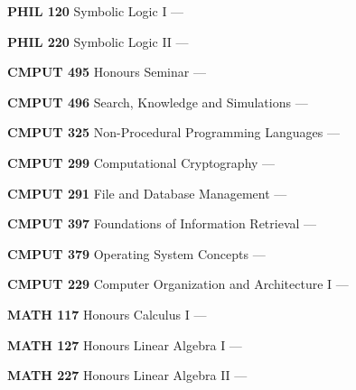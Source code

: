 \begin{cventries}
{\begin{multicols}{2}
\begin{cvitems}
        \item {\textbf{PHIL 120} Symbolic Logic I --- }
          \vspace{0.5mm}
        \item {\textbf{PHIL 220} Symbolic Logic II --- }
          \vspace{1.5mm}
        \item {\textbf{CMPUT 495} Honours Seminar --- }
        \item {\textbf{CMPUT 496} Search, Knowledge and Simulations --- }
          \vspace{0.5mm}
        \item {\textbf{CMPUT 325} Non-Procedural Programming Languages --- }
          \vspace{0.5mm}
        \item {\textbf{CMPUT 299} Computational Cryptography --- }
          \vspace{0.5mm}
        \item {\textbf{CMPUT 291} File and Database Management --- }
          \vspace{0.5mm}
        \item {\textbf{CMPUT 397} Foundations of Information Retrieval --- }
          \vspace{0.5mm}
        \item {\textbf{CMPUT 379} Operating System Concepts --- }
          \vspace{0.5mm}
        \item {\textbf{CMPUT 229} Computer Organization and Architecture I --- }
          \vspace{1.5mm}
        \item {\textbf{MATH 117} Honours Calculus I --- }
          \vspace{0.5mm}
        \item {\textbf{MATH 127} Honours Linear Algebra I --- }
          \vspace{0.5mm}
        \item {\textbf{MATH 227} Honours Linear Algebra II --- }
          \vspace{0.5mm}

\end{cvitems}
\end{multicols}}
\end{cventries}
